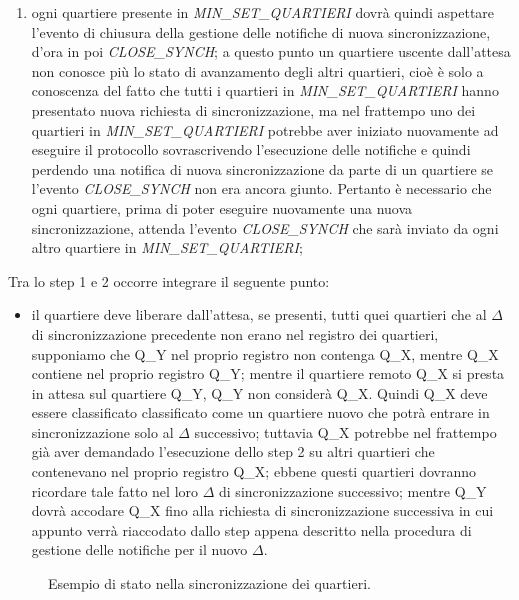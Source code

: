 \begin{enumerate}
\item ogni quartiere presente in \textit{MIN\_SET\_QUARTIERI} dovrà quindi aspettare l'evento di chiusura della gestione delle notifiche di nuova sincronizzazione, d'ora in poi \textit{CLOSE\_SYNCH}; a questo punto un quartiere uscente dall'attesa non conosce più lo stato di avanzamento degli altri quartieri, cioè è solo a conoscenza del fatto che tutti i quartieri in \textit{MIN\_SET\_QUARTIERI} hanno presentato nuova richiesta di sincronizzazione, ma nel frattempo uno dei quartieri in \textit{MIN\_SET\_QUARTIERI} potrebbe aver iniziato nuovamente ad eseguire il protocollo sovrascrivendo l'esecuzione delle notifiche e quindi perdendo una notifica di nuova sincronizzazione da parte di un quartiere se l'evento \textit{CLOSE\_SYNCH} non era ancora giunto. Pertanto è necessario che ogni quartiere, prima di poter eseguire nuovamente una nuova sincronizzazione, attenda l'evento \textit{CLOSE\_SYNCH} che sarà inviato da ogni altro quartiere in \textit{MIN\_SET\_QUARTIERI};
\end{enumerate}
Tra lo step 1 e 2 occorre integrare il seguente punto:  
\begin{itemize}
\item il quartiere deve liberare dall'attesa, se presenti, tutti quei quartieri che al $\Delta$ di sincronizzazione precedente non erano nel registro dei quartieri, supponiamo che Q\_Y nel proprio registro non contenga Q\_X, mentre Q\_X contiene nel proprio registro Q\_Y; mentre il quartiere remoto Q\_X si presta in attesa sul quartiere Q\_Y, Q\_Y non considerà Q\_X. Quindi Q\_X deve essere classificato classificato come un quartiere nuovo che potrà entrare in sincronizzazione solo al $\Delta$ successivo; tuttavia Q\_X potrebbe nel frattempo già aver demandado l'esecuzione dello step 2 su altri quartieri che contenevano nel proprio registro Q\_X; ebbene questi quartieri dovranno ricordare tale fatto nel loro $\Delta$ di sincronizzazione successivo; mentre Q\_Y dovrà accodare Q\_X fino alla richiesta di sincronizzazione successiva in cui appunto verrà riaccodato dallo step appena descritto nella procedura di gestione delle notifiche per il nuovo $\Delta$.
\end{itemize}

\begin{figure}[H] %
\caption{Esempio di stato nella sincronizzazione dei quartieri.}
\label{fig:Esempio di stato nella sincronizzazione dei quartieri}
\end{figure}

